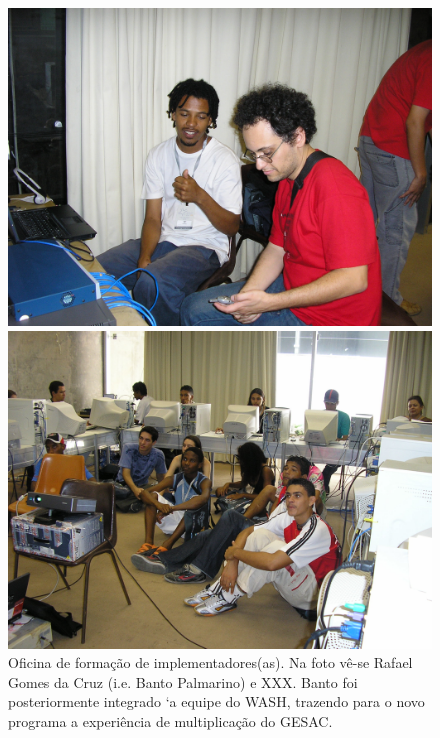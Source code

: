 \documentclass[
12pt,		%
openright,	%
twoside,  %
a4paper,			%
chapter=TITLE,		%
english,			%
french,				%
spanish,			%
brazil				%
]{USPSC-classe/USPSC}
\begin{document}
\captionsetup{format=plain}
\begin{figure}[max size={\textwidth}{\textheight}]

\centering


\begin{minipage}[b]{0.4\linewidth}
        \centering
                \includegraphics[width=1.0\linewidth]{../../imagens/bantorafa.JPG}
                \caption{Oficina de forma\c{c}\~ao de implementadores(as). Na foto v\^e-se Rafael Gomes da Cruz (i.e. Banto Palmarino) e XXX. Banto foi posteriormente integrado `a equipe do WASH, trazendo para o novo programa a experi\^encia de multiplica\c{c}\~ao do GESAC.}
                \label{d2d74ac61c1b95a746858e8420d24348e1b48f51}
\end{minipage}%
\hspace{0.5cm}
\begin{minipage}[b]{0.4\linewidth}
        \centering
                \includegraphics[width=1.0\linewidth]{../../imagens/oficinalac.JPG}

\end{minipage}
\end{figure}
\end{document}
